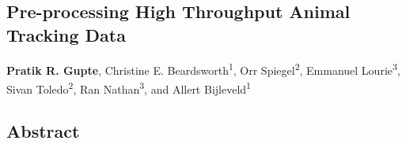 \begin{refsection}
\chapter{Pre-processing High Throughput Animal Tracking Data}\label{ch:preprocessing}
% 
{\noindent \textbf{Pratik R. Gupte}, Christine E. Beardsworth\textsuperscript{1}, Orr Spiegel\textsuperscript{2}, Emmanuel Lourie\textsuperscript{3}, Sivan Toledo\textsuperscript{2}, Ran Nathan\textsuperscript{3}, and Allert Bijleveld\textsuperscript{1}}


\section*{Abstract}
{
    \small
    	
}
\end{refsection}
